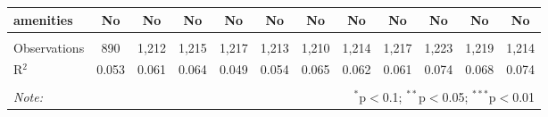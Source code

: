 \begin{table}[!htbp]
\begin{tabular}{@{\extracolsep{5pt}}lccccccccccc}
amenities & No & No & No & No & No & No & No & No & No & No & No \\ 
\hline \\[-1.8ex] 
Observations & 890 & 1,212 & 1,215 & 1,217 & 1,213 & 1,210 & 1,214 & 1,217 & 1,223 & 1,219 & 1,214 \\ 
R$^{2}$ & 0.053 & 0.061 & 0.064 & 0.049 & 0.054 & 0.065 & 0.062 & 0.061 & 0.074 & 0.068 & 0.074 \\ 
\hline 
\hline \\[-1.8ex] 
\textit{Note:}  & \multicolumn{11}{r}{$^{*}$p$<$0.1; $^{**}$p$<$0.05; $^{***}$p$<$0.01} \\ 
\end{tabular} 
\end{table} 
